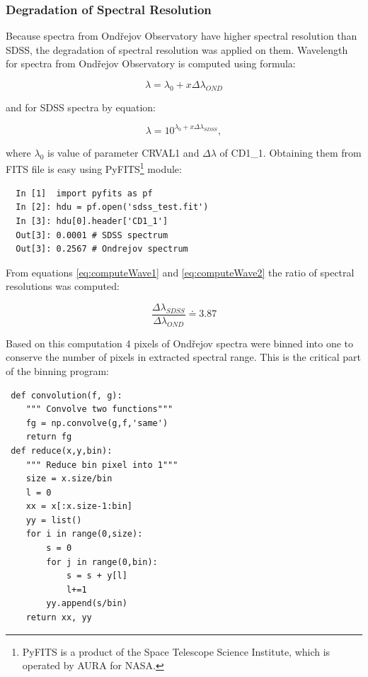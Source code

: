 \subsubsection{Degradation of Spectral Resolution}
Because spectra from Ond\v{r}ejov Observatory have higher spectral
resolution than SDSS, the degradation of spectral resolution was
applied on them. Wavelength for spectra from Ond\v{r}ejov Observatory
is computed using formula:

\begin{equation}
  \label{eq:computeWave1}
  \lambda = \lambda_0 + x\Delta\lambda_{OND} 
\end{equation}

\noindent and for SDSS spectra by equation:

\begin{equation}
  \label{eq:computeWave2}
  \lambda = 10^{\lambda_0 + x\Delta\lambda_{SDSS}},
\end{equation}

where $\lambda_0$ is value of parameter CRVAL1 and $\Delta\lambda$ of
CD1\_1. Obtaining them from FITS file is easy using
\textrm{PyFITS}\footnote{PyFITS is a product of the Space Telescope
  Science Institute, which is operated by AURA for NASA.}  module:

\begin{lstlisting}
  In [1]  import pyfits as pf
  In [2]: hdu = pf.open('sdss_test.fit')
  In [3]: hdu[0].header['CD1_1']
  Out[3]: 0.0001 # SDSS spectrum 
  Out[3]: 0.2567 # Ondrejov spectrum
\end{lstlisting}


\noindent From equations \ref{eq:computeWave1} and
\ref{eq:computeWave2} the ratio of spectral resolutions was computed:

\begin{equation}
  \label{eq:ratio}
  \frac{\Delta\lambda_{SDSS}}{\Delta\lambda_{OND}} \doteq  3.87
\end{equation}

\noindent Based on this computation 4 pixels of Ond\v{r}ejov spectra
were binned into one to conserve the number of pixels in extracted
spectral range. This is the critical part of the binning program:

\begin{lstlisting}
 def convolution(f, g):
    """ Convolve two functions"""
    fg = np.convolve(g,f,'same')
    return fg
 def reduce(x,y,bin):
    """ Reduce bin pixel into 1"""
    size = x.size/bin
    l = 0
    xx = x[:x.size-1:bin]
    yy = list()
    for i in range(0,size):
        s = 0
        for j in range(0,bin):
            s = s + y[l]
            l+=1
        yy.append(s/bin)
    return xx, yy
\end{lstlisting}

